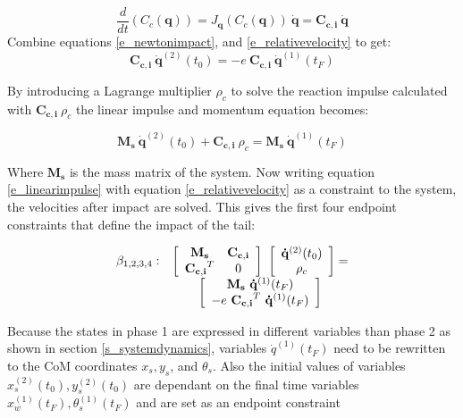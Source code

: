 \documentclass[default,iicol]{sn-jnl}
\theoremstyle{thmstyleone}%
\theoremstyle{thmstyletwo}%
\theoremstyle{thmstylethree}%
\begin{document}
\begin{equation}\label{e_relativevelocity}
    \frac{d}{dt}\left(C_c(\mathbf{q})\right) = J_{\mathbf{q}}(C_c(\mathbf{q}))\ \mathbf{\dot q} = \mathbf{C_{c,i}}\  \mathbf{\dot q}
\end{equation}
Combine equations \ref{e_newtonimpact}, and \ref{e_relativevelocity} to get:
\begin{equation}
    \mathbf{C_{c,i}}\  \mathbf{\dot q}^{(2)}(t_0) = -e\ \mathbf{C_{c,i}}\ \mathbf{\dot q}^{(1)}(t_F)
\end{equation}

By introducing a Lagrange multiplier $\rho_c$ to solve the reaction impulse calculated with $\mathbf{C_{c,i}}\ \rho_c$ the linear impulse and momentum equation becomes:

\begin{equation}\label{e_linearimpulse}
    \mathbf{M_s}\ \mathbf{\dot q}^{(2)}(t_0) + \mathbf{C_{c,i}}\ \rho_c = \mathbf{M_s}\ \mathbf{\dot q}^{(1)}(t_F)
\end{equation}

Where $\mathbf{M_s}$ is the mass matrix of the system. Now writing equation \ref{e_linearimpulse} with equation \ref{e_relativevelocity} as a constraint to the system, the velocities after impact are solved. This gives the first four endpoint constraints that define the impact of the tail:

\begin{equation}
\begin{array}{l c}
    \beta_{1,2,3,4}: & \left[\begin{array}{cc}
        \mathbf{M_s} & \mathbf{C_{c,i}} \\
        \mathbf{C_{c,i}}^T & 0
    \end{array} \right]\
    \left[\begin{array}{c}
       \mathbf{\dot q}^{(2)}(t_0)  \\
        \rho_c 
    \end{array}\right] =
     \\ &  
     \left[\begin{array}{c}
         \mathbf{M_s}\ \mathbf{\dot q}^{(1)}(t_F)   \\
         -e\ \mathbf{C_{c,i}}^T\ \mathbf{\dot q}^{(1)}(t_F)
    \end{array}\right]
    \end{array}
\end{equation}

Because the states in phase 1 are expressed in different variables than phase 2 as shown in section \ref{s_systemdynamics}, variables $\dot q^{(1)}(t_F)$ need to be rewritten to the CoM coordinates $x_s,y_s$, and $\theta_s$. Also the initial values of variables $x_s^{(2)}(t_0), y_s^{(2)}(t_0)$ are dependant on the final time variables $x_w^{(1)}(t_F), \theta_s^{(1)}(t_F)$ and are set as an endpoint constraint
\end{document}
